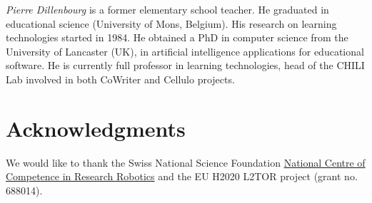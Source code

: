 \documentclass{sig-alternate-05-2015}
\begin{document}
\emph{Pierre Dillenbourg} is a former elementary school teacher. He graduated in educational science (University of Mons, Belgium). His research on learning technologies started in 1984. He obtained a PhD in computer science from the University of Lancaster (UK), in artificial intelligence applications for educational software. He is currently full professor in learning technologies, head of the CHILI Lab involved in both CoWriter and Cellulo projects.

\section{Acknowledgments}
We would like to thank the Swiss National Science Foundation 
\href{http://www.nccr-robotics.ch/}{National Centre of Competence in Research 
Robotics} and the EU H2020 L2TOR project (grant no. 688014).

\small

  
\end{document}
